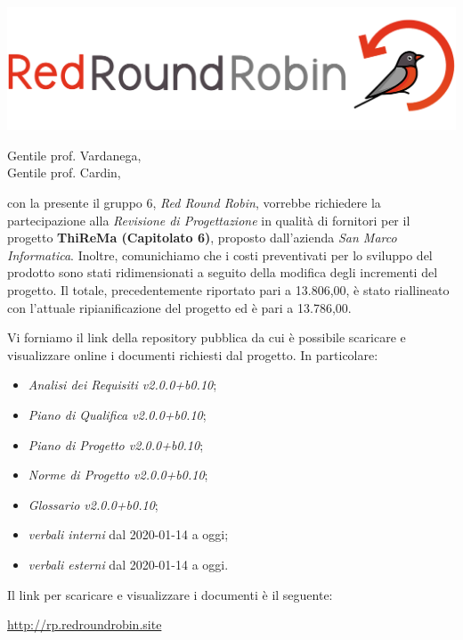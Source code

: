 \documentclass[12pt]{letter}
\date{09 marzo 2020}
\begin{document}
\begin{letter}{ }

\includegraphics[scale=0.17]{images/logo.png}

\opening{Gentile prof. Vardanega,\\ Gentile prof. Cardin, }

con la presente il gruppo 6, \textit{Red Round Robin}, vorrebbe richiedere la partecipazione alla \textit{Revisione di Progettazione} in qualità di fornitori per il progetto \textbf{ThiReMa (Capitolato 6)}, proposto dall'azienda \textit{San Marco Informatica}.
Inoltre, comunichiamo che i costi preventivati per lo sviluppo del prodotto sono stati ridimensionati a seguito della modifica degli incrementi del progetto. Il totale, precedentemente riportato pari a \EUR{}13.806,00, è stato riallineato con l'attuale ripianificazione del progetto ed è pari a \EUR{}13.786,00.

Vi forniamo il link della repository pubblica da cui è possibile scaricare e visualizzare online i documenti richiesti dal progetto.
In particolare:

\begin{itemize}
	\item \textit{Analisi dei Requisiti v2.0.0+b0.10};
	\item \textit{Piano di Qualifica v2.0.0+b0.10};
	\item \textit{Piano di Progetto v2.0.0+b0.10};
	\item \textit{Norme di Progetto v2.0.0+b0.10};
	\item \textit{Glossario v2.0.0+b0.10};
	\item \textit{verbali interni} dal 2020-01-14 a oggi;
	\item \textit{verbali esterni} dal 2020-01-14 a oggi.
\end{itemize}

\newpage

Il link per scaricare e visualizzare i documenti è il seguente:

\begin{center}
	\href{https://drive.google.com/}{http://rp.redroundrobin.site}
\end{center}



\end{letter}
\end{document}
